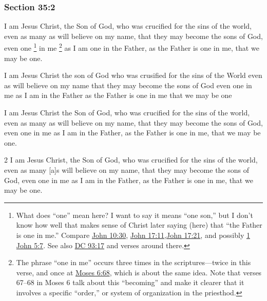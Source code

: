 	\subsubsection{Section 35:2} %
		\label{DC35-2}

		I am Jesus Christ, the Son of God, who was crucified for the sins of the world, even as many as will believe on my name, that they may become the sons of God, even one%
			\footnote{%
				What does ``one'' mean here? I want to say it means ``one son,'' but I don't know how well that makes sense of Christ later saying (here) that ``the Father is one in me.'' Compare \hyperref[JOHN-10-30]{John 10:30}, \hyperref[JOHN-17-11]{John 17:11},\hyperref[JOHN-17-21]{John 17:21}, and possibly \hyperref[1JOHN-5-7]{1 John 5:7}. See also \hyperref[DC93-17]{DC 93:17} and verses around there.
				}
		in me%
			\footnote{%
				The phrase ``one in me'' occurs three times in the scriptures---twice in this verse, and once at \hyperref[MOSES-6-68]{Moses 6:68}, which is about the same idea. Note that verses 67--68 in Moses 6 talk about this ``becoming'' and make it clearer that it involves a specific ``order,'' or system of organization in the priesthod.
				}
		as I am one in the Father, as the Father is one in me, that we may be one.

		\begin{framed}
		\scriptsize
			\begin{compactdesc}
				\item[JSP] I am Jesus Christ the son of God who was crusified for the sins of the World even as will believe on my name that they may become the sons of God even one in me as I am in the Father as the Father is one in me that we may be one
				\item[Rider] I am Jesus Christ the Son of God, who was crucified for the sins of the world, even as many as will believe on my name, that they may become the sons of God, even one in me as I am in the Father, as the Father is one in me, that we may be one.
				\item[BC] 2 I am Jesus Christ, the Son of God, who was crucified for the sins of the world, even as many [a]s will believe on my name, that they may become the sons of God, even one in me as I am in the Father, as the Father is one in me, that we may be one.
			\end{compactdesc}
		\end{framed}

